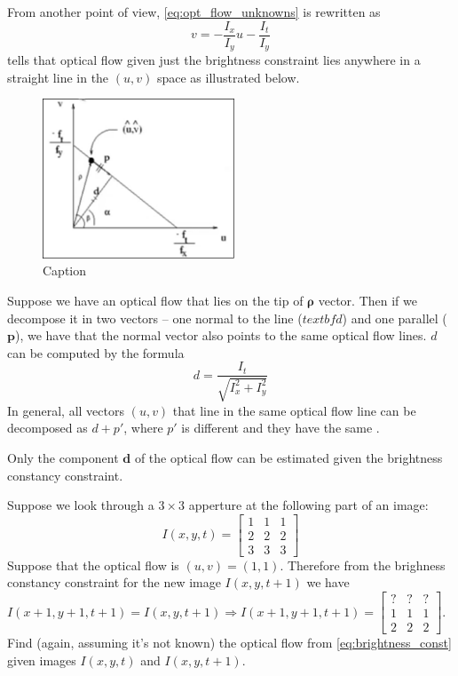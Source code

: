 \documentclass[a4paper]{article}
\begin{document}
From another point of view, \eqref{eq:opt_flow_unknowns}  is rewritten as
\begin{equation}
    v = -\frac{I_x}{I_y}u - \frac{I_t}{I_y}
\end{equation}
tells that optical flow given just the brightness constraint lies anywhere in a straight line in the $(u,v)$ space as illustrated below.
\begin{figure}[H]
    \centering
    \includegraphics[height=4.75cm]{img/opt_flow/opt_flow_straight_line.png}
    \caption{Caption}
    \label{fig:my_label}
\end{figure}
Suppose we have an optical flow that lies on the tip of $\boldsymbol{\rho}$ vector. Then if we decompose it in two vectors -- one normal to the line ($textbf{d}$) and one parallel ($\textbf{p}$), we have that the normal vector also points to the same optical flow lines. $d$ can be computed by the formula
\begin{equation}
    d =\frac{I_t}{\sqrt{I_x^2 + I_y^2}}
\end{equation}
In general, all vectors $(u,v)$ that line in the same optical flow line  can be decomposed as $d+p\prime$, where $p\prime$ is different and they have the same .
\begin{corollary}
Only the  component $\textbf{d}$ of the optical flow can be estimated given the brightness constancy constraint.
\label{cor:opt_flow_line}
\end{corollary}
\begin{exmp}
Suppose we look through a $3\times3$ apperture at the following part of an image: 
\[
I(x,y,t) = \begin{bmatrix}1 & 1 & 1\\ 2 & 2 & 2\\3 & 3 &3 \end{bmatrix}
\]
Suppose that the optical flow is $(u,v)=(1,1)$. Therefore from the brighness constancy constraint for the new image $I(x,y,t+1)$ we have $I(x+1,y+1,t+1) = I(x,y,t+1)\Rightarrow I(x+1,y+1,t+1) = \begin{bmatrix} ? & ? & ?\\ 1 & 1 & 1\\ 2 & 2 & 2\end{bmatrix}$. Find (again, assuming it's not known) the optical flow from \eqref{eq:brightness_const} given images $I(x,y,t)$ and $I(x,y,t+1)$.
\end{exmp}
\end{document}
